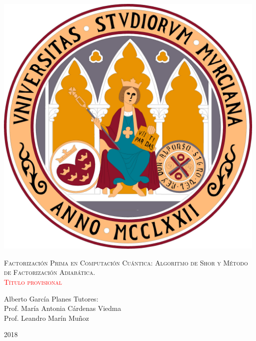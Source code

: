 \documentclass[11pt, spanish]{report}
\newcommand{\red}[1]{\textcolor{red}{#1}}
\numberwithin{equation}{section}
\numberwithin{defin}{section}
\begin{document}
\begin{titlepage}
	\centering
	\includegraphics[scale=.4]{escudo_umu1.jpg} \\
    \vspace{1cm}
	{\scshape\LARGE Factorización Prima en Computación Cuántica: Algoritmo de Shor y Método de Factorización Adiabática.\\\vspace{1cm} \red{\small{Título provisional}}\\\par}
	\vspace{1cm}
	Alberto García Planes
    \vfill
	Tutores:\\
	Prof. María Antonia Cárdenas Viedma \\
	Prof. Leandro Marín Muñoz
	\vspace{2cm}

	{\large 2018 \par}
\end{titlepage}
\end{document}
